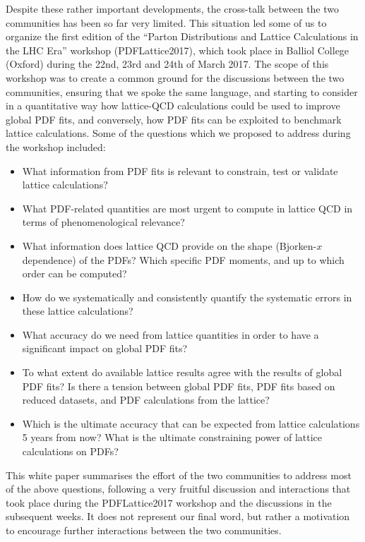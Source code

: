 Despite these rather important developments, the cross-talk between the
two communities has been so far very limited. This situation led some of us
to organize the first edition of the ``Parton Distributions and Lattice Calculations in the LHC Era''
workshop (PDFLattice2017), which took
place in Balliol College (Oxford) during the 22nd, 23rd and 24th of March 2017.
%
The scope of this workshop was to create a common ground for the discussions
between the two communities, ensuring that we spoke the same language,
and starting to consider in a quantitative way how lattice-QCD calculations could be used
to improve global PDF fits, and conversely, how PDF fits can be exploited to benchmark lattice calculations.
%
Some of the questions which we proposed to address during the workshop
included:
\begin{itemize}
\item What information from PDF fits is relevant to constrain, test or validate lattice calculations?

\item What PDF-related quantities are most urgent
  to compute in lattice QCD in terms of phenomenological relevance?

\item What information does lattice QCD provide on the
  shape (Bjorken-$x$ dependence) of the PDFs? Which specific
  PDF moments,
  and up to which order can be computed?
  
\item How do we systematically and consistently quantify the systematic errors in these lattice calculations?

\item What accuracy do we need from lattice quantities 
  in order to have a significant impact on global PDF fits?

\item To what extent do available lattice results agree with the results of
  global PDF fits? Is there a tension between global PDF fits, PDF
  fits based on reduced datasets, and PDF calculations from the lattice?

  \item Which is the ultimate accuracy that can be expected from lattice
calculations 5 years from now? What is the ultimate
constraining power of lattice calculations on PDFs?

\end{itemize}

This white paper summarises the effort of the two communities to address most
of the above questions, following a very fruitful discussion and interactions that took
place during the PDFLattice2017 workshop and the discussions in the subsequent weeks.
%
It does not represent our final word, but rather a motivation to encourage further
interactions between the two communities.


